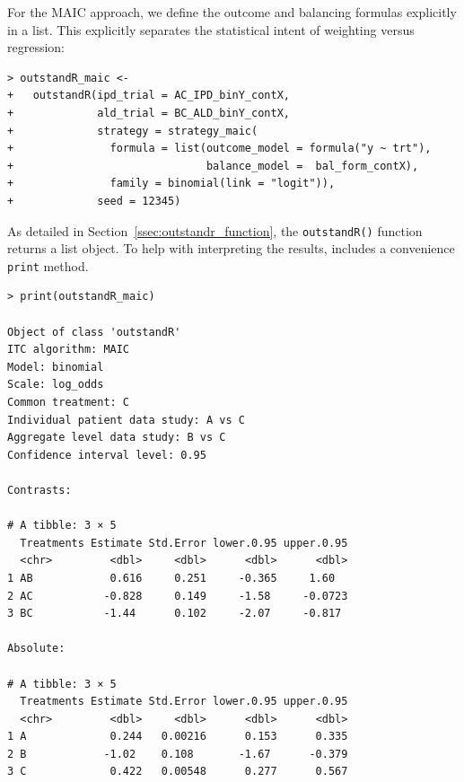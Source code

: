\documentclass[article]{jss}
\begin{document}
For the MAIC approach, we define the outcome and balancing formulas explicitly in a list. This explicitly separates the statistical intent of weighting versus regression:

\begin{verbatim}
> outstandR_maic <-
+   outstandR(ipd_trial = AC_IPD_binY_contX,
+             ald_trial = BC_ALD_binY_contX,
+             strategy = strategy_maic(
+               formula = list(outcome_model = formula("y ~ trt"),
+                              balance_model =  bal_form_contX),
+               family = binomial(link = "logit")),
+             seed = 12345)
\end{verbatim}

As detailed in Section~\ref{ssec:outstandr_function}, the \texttt{outstandR()} function returns a list object. To help with interpreting the results,  includes a convenience \texttt{print} method.

\begin{verbatim}
> print(outstandR_maic)

Object of class 'outstandR' 
ITC algorithm: MAIC 
Model: binomial 
Scale: log_odds 
Common treatment: C 
Individual patient data study: A vs C 
Aggregate level data study: B vs C 
Confidence interval level: 0.95 

Contrasts:

# A tibble: 3 × 5
  Treatments Estimate Std.Error lower.0.95 upper.0.95
  <chr>         <dbl>     <dbl>      <dbl>      <dbl>
1 AB            0.616     0.251     -0.365     1.60  
2 AC           -0.828     0.149     -1.58     -0.0723
3 BC           -1.44      0.102     -2.07     -0.817 

Absolute:

# A tibble: 3 × 5
  Treatments Estimate Std.Error lower.0.95 upper.0.95
  <chr>         <dbl>     <dbl>      <dbl>      <dbl>
1 A             0.244   0.00216      0.153      0.335
2 B            -1.02    0.108       -1.67      -0.379
3 C             0.422   0.00548      0.277      0.567
\end{verbatim}
\end{document}
